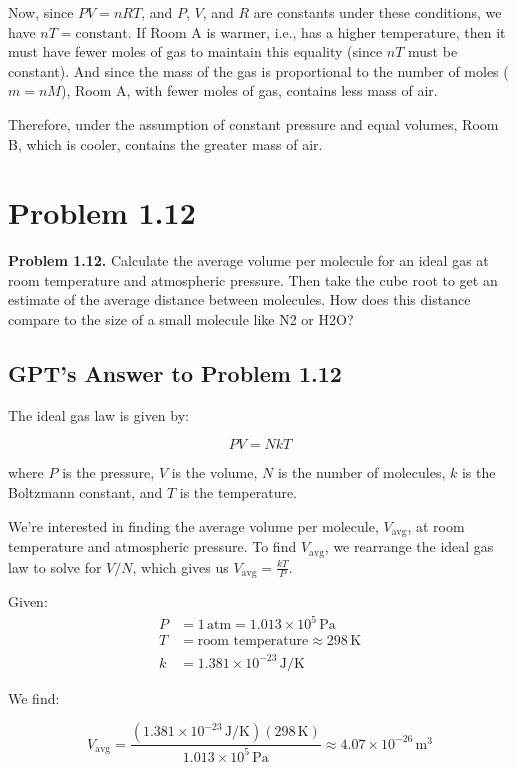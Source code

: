 \documentclass[12pt]{article}
\begin{document}
Now, since \(PV = nRT\), and \(P\), \(V\), and \(R\) are constants under these conditions, we have \(nT = \text{constant}\). If Room A is warmer, i.e., has a higher temperature, then it must have fewer moles of gas to maintain this equality (since \(nT\) must be constant). And since the mass of the gas is proportional to the number of moles (\(m = nM\)), Room A, with fewer moles of gas, contains less mass of air.

Therefore, under the assumption of constant pressure and equal volumes, Room B, which is cooler, contains the greater mass of air.

\section*{Problem 1.12}

\textbf{Problem 1.12.} Calculate the average volume per molecule for an ideal gas at room temperature and atmospheric pressure. Then take the cube root to get an estimate of the average distance between molecules. How does this distance compare to the size of a small molecule like N2 or H2O?

\subsection*{GPT's Answer to Problem 1.12}

The ideal gas law is given by:

\[
PV = NkT
\]

where \(P\) is the pressure, \(V\) is the volume, \(N\) is the number of molecules, \(k\) is the Boltzmann constant, and \(T\) is the temperature.

We're interested in finding the average volume per molecule, \(V_{\text{avg}}\), at room temperature and atmospheric pressure. To find \(V_{\text{avg}}\), we rearrange the ideal gas law to solve for \(V/N\), which gives us \(V_{\text{avg}} = \frac{kT}{P}\).

Given: 
\begin{align*}
P & = 1 \, \text{atm} = 1.013 \times 10^5 \, \text{Pa} \\
T & = \text{room temperature} \approx 298 \, \text{K} \\
k & = 1.381 \times 10^{-23} \, \text{J/K}
\end{align*}

We find:

\[
V_{\text{avg}} = \frac{(1.381 \times 10^{-23} \, \text{J/K})(298 \, \text{K})}{1.013 \times 10^5 \, \text{Pa}} \approx 4.07 \times 10^{-26} \, \text{m}^3
\]
\end{document}
